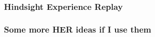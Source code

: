 




\begin{frame}
	\frametitle{Hindsight Experience Replay}	
	\vspace{1cm}
	
	
\end{frame}
\clearpage






\begin{frame}
	\frametitle{Some more HER ideas if I use them}	
	\vspace{1cm}
	
	
\end{frame}
\clearpage




